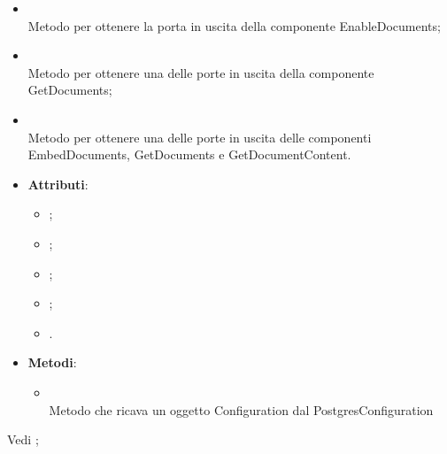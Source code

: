 \documentclass[10pt, a4paper]{article}
\begin{document}
\begin{itemize}
\begin{itemize}
        \item {}\\
        Metodo per ottenere la porta in uscita della componente EnableDocuments;

        \item {}\\ 
        Metodo per ottenere una delle porte in uscita della componente GetDocuments;

        \item {}\\        
        Metodo per ottenere una delle porte in uscita delle componenti EmbedDocuments, GetDocuments e GetDocumentContent.

        

    \end{itemize}
\end{itemize}


\label{PostgresConfigurationDettaglio}
\begin{itemize}
    \item \textbf{Attributi}:
    \begin{itemize}
        \item {};
        \item {};
        \item {};
        \item {};
        \item {}. 
    \end{itemize}
    \item \textbf{Metodi}:
    \begin{itemize}
        \item {}\\
        Metodo che ricava un oggetto Configuration dal PostgresConfiguration
    \end{itemize}
\end{itemize}

Vedi ;
\end{document}
